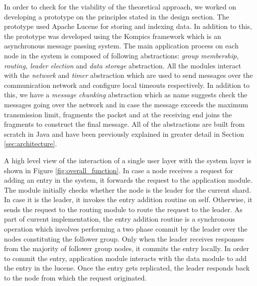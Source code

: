 \documentclass[a4paper,11pt]{kth-mag}
\begin{document}
In order to check for the viability of the theoretical approach, we worked on developing a prototype on the principles stated in the design section. The prototype used Apache Lucene for storing and indexing data. In addition to this, the prototype was developed using the Kompics framework which is an asynchronous message passing system. The main application process on each node in the system is composed of following abstractions: \textit {group membership, routing, leader election} and \textit{data storage} abstraction. All the modules interact with the \textit{network} and \textit{timer} abstraction which are used to send messages over the communication network and configure local timeouts respectively. In addition to this, we have a \textit{message chunking} abstraction which as name suggests check the messages going over the network and in case the message exceeds the maximum transmission limit, fragments the packet and at the receiving end joins the fragments to construct the final message. All of the abstractions are built from scratch in Java and have been previously explained in greater detail in Section \ref{sec:architecture}.

\par A high level view of the interaction of a single user layer with the system layer is shown in Figure \ref{fig:overall_function}. In case a node receives a request for adding an entry in the system, it forwards the request to the application module. The module initially checks whether the node is the leader for the current shard. In case it is the leader, it invokes the entry addition routine on self. Otherwise, it sends the request to the routing module to route the request to the leader. As part of current implementation, the entry addition routine is a synchronous operation which involves performing a two phase commit by the leader over the nodes constituting the follower group. Only when the leader receives responses from the majority of follower group nodes, it commits the entry locally. In order to commit the entry, application module interacts with the data module to add the entry in the lucene. Once the entry gets replicated, the leader responds back to the node from which the request originated.
\end{document}
